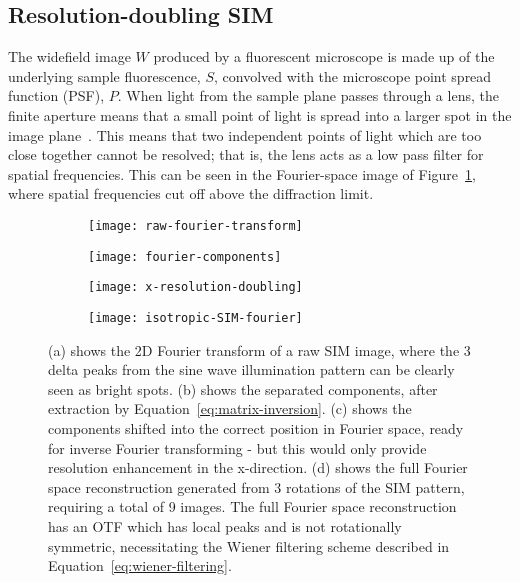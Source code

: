 
\subsection{Resolution-doubling SIM} \label{sec:SIM-theory}

The widefield image $W$ produced by a fluorescent microscope is made up of the underlying sample fluorescence, $S$, convolved with the microscope point spread function (PSF), $P$. 
When light from the sample plane passes through a lens, the finite aperture means that a small point of light is spread into a larger spot in the image plane~\cite[\textit{ch. 11}]{hecht2017optics}. 
This means that two independent points of light which are too close together cannot be resolved; that is, the lens acts as a low pass filter for spatial frequencies. 
This can be seen in the Fourier-space image of Figure~\ref{fig:raw-fourier-transform}, where spatial frequencies cut off above the diffraction limit. 

\begin{figure}[p]
\centering
\begin{subfigure}[b]{0.49\textwidth}
	\texttt{[image: raw-fourier-transform]}
	\caption{}\label{fig:raw-fourier-transform}
\end{subfigure}
\hfill
\begin{subfigure}[b]{0.49\textwidth}
	\texttt{[image: fourier-components]}
	\caption{}\label{fig:fourier-components}
\end{subfigure}

\begin{subfigure}[b]{0.49\textwidth}
	\texttt{[image: x-resolution-doubling]}
	\caption{}\label{fig:x-resolution-doubling}
\end{subfigure}
\hfill
\begin{subfigure}[b]{0.49\textwidth}
	\texttt{[image: isotropic-SIM-fourier]}
	\caption{}\label{fig:isotropic-SIM-fourier}
\end{subfigure}
\caption[LAG SIM: Reconstruction of SIM images takes place in Fourier space]{(a) shows the 2D Fourier transform of a raw SIM image, where the 3 delta peaks from the sine wave illumination pattern can be clearly seen as bright spots. (b) shows the separated components, after extraction by Equation~\ref{eq:matrix-inversion}. (c) shows the components shifted into the correct position in Fourier space, ready for inverse Fourier transforming - but this would only provide resolution enhancement in the x-direction. (d) shows the full Fourier space reconstruction generated from 3 rotations of the SIM pattern, requiring a total of 9 images. The full Fourier space reconstruction has an OTF which has local peaks and is not rotationally symmetric, necessitating the Wiener filtering scheme described in Equation~\ref{eq:wiener-filtering}.}
\label{fig:fourier-reconstruction}
\end{figure}


